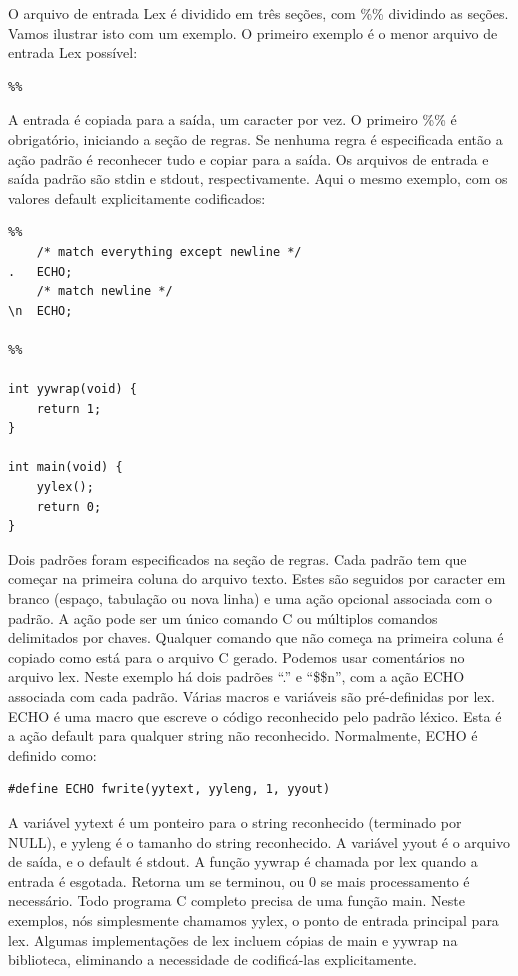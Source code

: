 \documentclass[
  brazilian,
  letterpaper,
]{book}
\theoremstyle{plain}
\theoremstyle{definition}
\theoremstyle{remark}
\begin{document}
O arquivo de entrada Lex é dividido em três seções, com \%\% dividindo
as seções. Vamos ilustrar isto com um exemplo. O primeiro exemplo é o
menor arquivo de entrada Lex possível:

\begin{verbatim}
%%
\end{verbatim}

A entrada é copiada para a saída, um caracter por vez. O primeiro \%\% é
obrigatório, iniciando a seção de regras. Se nenhuma regra é
especificada então a ação padrão é reconhecer tudo e copiar para a
saída. Os arquivos de entrada e saída padrão são stdin e stdout,
respectivamente. Aqui o mesmo exemplo, com os valores default
explicitamente codificados:

\begin{verbatim}
%%
    /* match everything except newline */
.   ECHO;
    /* match newline */
\n  ECHO;

%%

int yywrap(void) {
    return 1;
}

int main(void) {
    yylex();
    return 0;
}
\end{verbatim}

Dois padrões foram especificados na seção de regras. Cada padrão tem que
começar na primeira coluna do arquivo texto. Estes são seguidos por
caracter em branco (espaço, tabulação ou nova linha) e uma ação opcional
associada com o padrão. A ação pode ser um único comando C ou múltiplos
comandos delimitados por chaves. Qualquer comando que não começa na
primeira coluna é copiado como está para o arquivo C gerado. Podemos
usar comentários no arquivo lex. Neste exemplo há dois padrões ``.'' e
``\$\$n'', com a ação ECHO associada com cada padrão. Várias macros e
variáveis são pré-definidas por lex. ECHO é uma macro que escreve o
código reconhecido pelo padrão léxico. Esta é a ação default para
qualquer string não reconhecido. Normalmente, ECHO é definido como:

\begin{verbatim}
#define ECHO fwrite(yytext, yyleng, 1, yyout)
\end{verbatim}

A variável yytext é um ponteiro para o string reconhecido (terminado por
NULL), e yyleng é o tamanho do string reconhecido. A variável yyout é o
arquivo de saída, e o default é stdout. A função yywrap é chamada por
lex quando a entrada é esgotada. Retorna um se terminou, ou 0 se mais
processamento é necessário. Todo programa C completo precisa de uma
função main. Neste exemplos, nós simplesmente chamamos yylex, o ponto de
entrada principal para lex. Algumas implementações de lex incluem cópias
de main e yywrap na biblioteca, eliminando a necessidade de codificá-las
explicitamente.
\end{document}
